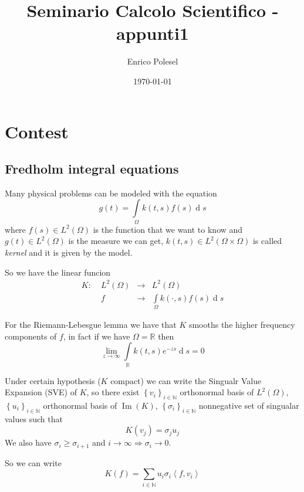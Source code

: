 \documentclass[a4paper,10pt]{article}
\title{Seminario Calcolo Scientifico - appunti1}
\author{Enrico Polesel}
\date{\today}
\theoremstyle{plain}
\theoremstyle{definition}
\theoremstyle{remark}
\newcommand{\set}[1]{\left\{#1\right\}}
\newcommand{\ang}[1]{\left<#1\right>}
\newcommand{\intl}{\int \limits}
\DeclareMathOperator{\de}{d}
\DeclareMathOperator{\im}{Im}
\begin{document}
\maketitle

\section{Contest}
\label{sec:contest}

\subsection{Fredholm integral equations}
\label{sec:fredholm}

Many physical problems can be modeled with the equation
\begin{equation}
  \label{eq:fredholm}
  g(t) = \intl _{\Omega} k(t,s) f(s) \de s
\end{equation}
where $f(s)\in L^2(\Omega)$ is the function that we want to know and
$g(t)\in L^2(\Omega)$ is the measure we can get, $k(t,s) \in
L^2(\Omega \times \Omega)$ is called \textit{kernel} and it is given
by the model.

So we have the linear funcion
\[ \begin{matrix}
  K:\; &L^2(\Omega) &\longrightarrow &L^2(\Omega)\\
  & f &\longrightarrow & \intl _\Omega k(\cdot , s) f(s) \de s
  \end{matrix}
\]

For the Riemann-Lebesgue lemma we have that $K$ smooths the higher
frequency components of $f$, in fact if we have $\Omega = \mathbb{R}$
then
\[ \lim _{z \to \infty} \intl _\mathbb{R} k(t,s) e^{-zs} \de s = 0 \]

Under certain hypothesis ($K$ compact) we can write the Singualr Value
Expansion (SVE) of $K$, so there exist $\set{v_i}_{i\in \mathbb{N}}$
orthonormal basis of $L^2(\Omega)$, $\set{u_i}_{i\in \mathbb{N}}$
orthonormal basis of $\im(K)$, $\set{\sigma _i}_{i\in \mathbb{N}}$
nonnegative set of singualar values such that
\begin{equation}
  \label{eq:SVErealtion}
  K(v_j) = \sigma _j u_j
\end{equation}
We also have $\sigma _i \ge \sigma _{i+1}$ and $i \to \infty \Rightarrow
\sigma _i \to 0$.

So we can write
\begin{equation}
  \label{eq:SVE}
  K(f) = \sum _{i\in \mathbb{N}} u_i \sigma _i \ang{f,v_i}
\end{equation}
\end{document}

